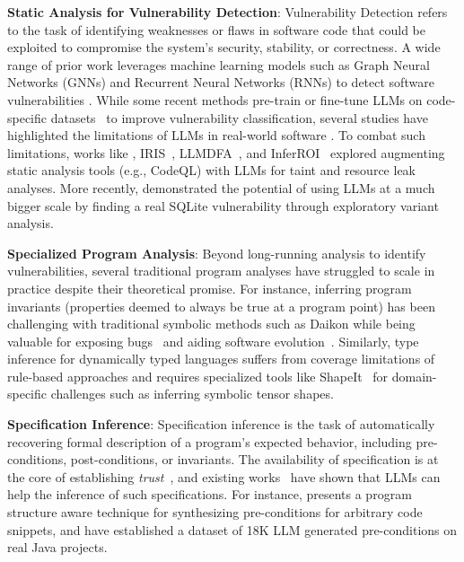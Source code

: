 \textbf{Static Analysis for Vulnerability Detection}:
Vulnerability Detection refers to the task of identifying weaknesses or flaws in software code that could be exploited to compromise the system's security, stability, or correctness.
A wide range of prior work leverages machine learning models such as Graph Neural Networks (GNNs) and Recurrent Neural Networks (RNNs) to detect software vulnerabilities \citep{Zhou2019DevignEV, Chakraborty2020DeepLB, Dinella2020Hoppity, Hin2022LineVDSV, Li2021VulnerabilityDW}.
While some recent methods pre-train or fine-tune LLMs on code-specific datasets~\citep{fu2022linevul, steenhoek2023dataflow, Cheng2022PathsensitiveCE} to improve vulnerability classification, several studies have highlighted the limitations of LLMs in real-world software \citep{steenhoek2024comprehensive,ding2024vulnerability,khare2023understanding}. 
To combat such limitations, works like \citet{li2024llift}, IRIS~\citep{li2024llm}, LLMDFA~\citep{wang2024llmdfaanalyzingdataflowcode}, and InferROI~\citep{wang2023boosting} explored augmenting static analysis tools (e.g., CodeQL) with LLMs for taint and resource leak analyses.
More recently, \citet{bigsleep} demonstrated the potential of using LLMs at a much bigger scale by finding a real SQLite vulnerability through exploratory variant analysis.

\textbf{Specialized Program Analysis}:
Beyond long-running analysis to identify vulnerabilities, several traditional program analyses have struggled to scale in practice despite their theoretical promise. 
For instance, inferring program invariants (properties deemed to always be true at a program point) has been challenging with traditional symbolic methods such as Daikon \citep{ernst2007daikon, padon2016decidability} while being valuable for exposing bugs~\citep{hangal2002tracking} and aiding software evolution~\citep{ernst1999dynamically}. 
Similarly, type inference for dynamically typed languages suffers from coverage limitations of rule-based approaches and requires specialized tools like ShapeIt~\citep{zheng2024dynamic} for domain-specific challenges such as inferring symbolic tensor shapes.

\textbf{Specification Inference}:
Specification inference is the task of automatically recovering formal description of a program's expected behavior, including pre-conditions, post-conditions, or invariants.
The availability of specification is at the core of establishing \textit{trust}~\citep{roychoudhury2025aisoftwareengineerprogramming}, and existing works~\citep{dinella2024infer, ruan2024specrovercodeintentextraction} have shown that LLMs can help the inference of such specifications.
For instance, \citet{dinella2024programstructureawareprecondition} presents a program structure aware technique for synthesizing pre-conditions for arbitrary code snippets, and have established a dataset of 18K LLM generated pre-conditions on real Java projects.

